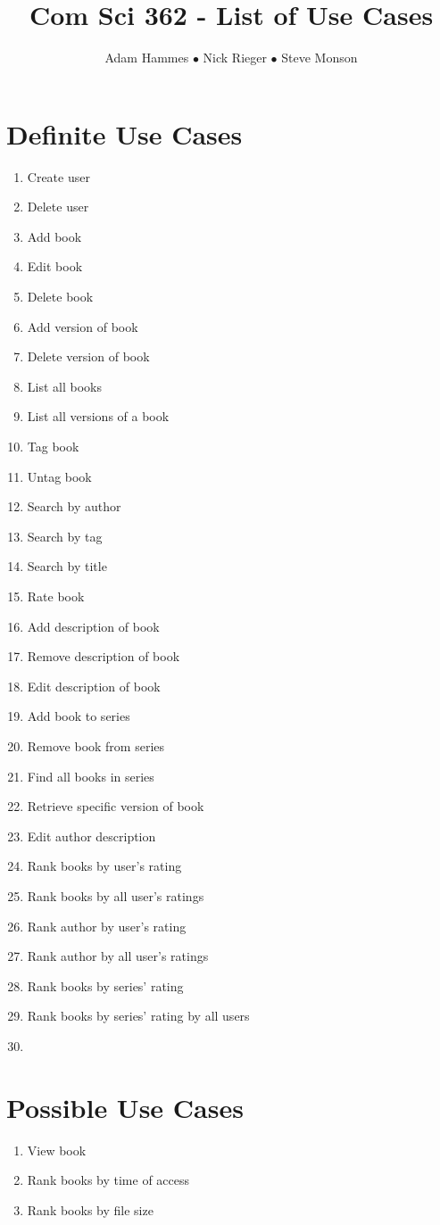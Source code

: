 \documentclass[11pt]{article}
\title{Com Sci 362 - List of Use Cases}
\author{Adam Hammes $\bullet$ Nick Rieger $\bullet$ Steve Monson}
\begin{document}
\maketitle


\section*{Definite Use Cases}

\begin{enumerate}[(1)]
    \item Create user
    \item Delete user
    \item Add book
    \item Edit book
    \item Delete book
    \item Add version of book
    \item Delete version of book
    \item List all books
    \item List all versions of a book
    \item Tag book
    \item Untag book
    \item Search by author
    \item Search by tag
    \item Search by title
    \item Rate book
    \item Add description of book
    \item Remove description of book
    \item Edit description of book
    \item Add book to series
    \item Remove book from series
    \item Find all books in series
    \item Retrieve specific version of book
    \item Edit author description
    \item Rank books by user's rating
    \item Rank books by all user's ratings
    \item Rank author by user's rating
    \item Rank author by all user's ratings
    \item Rank books by series' rating
    \item Rank books by series' rating by all users
    \item
\end{enumerate}


\section*{Possible Use Cases}

\begin{enumerate}[(1)]
    \item View book
    \item Rank books by time of access
    \item Rank books by file size
\end{enumerate}
\end{document}
